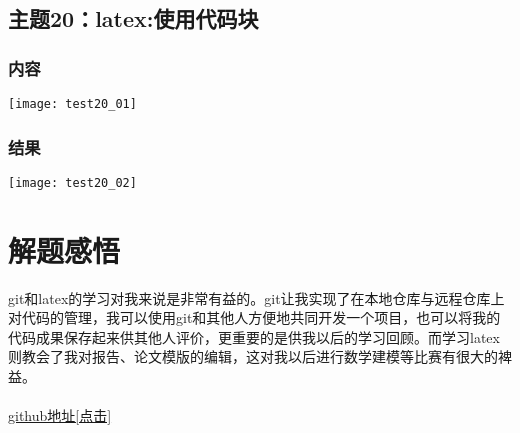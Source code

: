 \documentclass{article}
\begin{document}
\subsection{主题20：latex:使用代码块}  
\subsubsection{内容}
\texttt{[image: test20\_01]}\\
\subsubsection{结果} 
\texttt{[image: test20\_02]}\\ 
\newpage
\thispagestyle{empty}
\section{解题感悟}  
 git和latex的学习对我来说是非常有益的。git让我实现了在本地仓库与远程仓库上对代码的管理，我可以使用git和其他人方便地共同开发一个项目，也可以将我的代码成果保存起来供其他人评价，更重要的是供我以后的学习回顾。而学习latex则教会了我对报告、论文模版的编辑，这对我以后进行数学建模等比赛有很大的裨益。\\\\
\href{https://github.com/coff-sug/system_development.git}{github地址[点击]}
\end{document}
